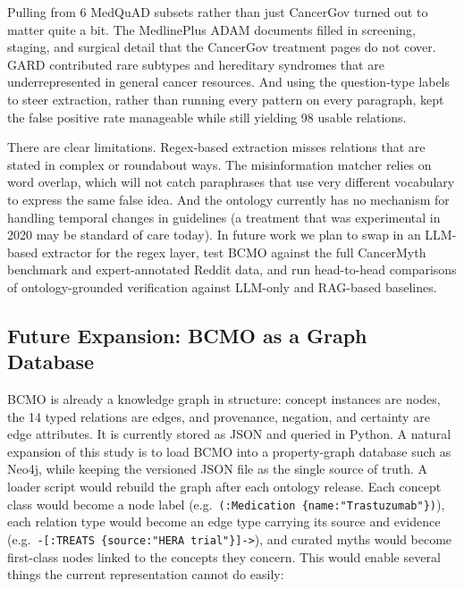 \documentclass[10pt,a4paper]{article}
\begin{document}
Pulling from 6 MedQuAD subsets rather than just CancerGov turned out to matter quite a bit. The MedlinePlus ADAM documents filled in screening, staging, and surgical detail that the CancerGov treatment pages do not cover. GARD contributed rare subtypes and hereditary syndromes that are underrepresented in general cancer resources. And using the question-type labels to steer extraction, rather than running every pattern on every paragraph, kept the false positive rate manageable while still yielding 98 usable relations.

There are clear limitations. Regex-based extraction misses relations that are stated in complex or roundabout ways. The misinformation matcher relies on word overlap, which will not catch paraphrases that use very different vocabulary to express the same false idea. And the ontology currently has no mechanism for handling temporal changes in guidelines (a treatment that was experimental in 2020 may be standard of care today). In future work we plan to swap in an LLM-based extractor for the regex layer, test BCMO against the full CancerMyth benchmark and expert-annotated Reddit data, and run head-to-head comparisons of ontology-grounded verification against LLM-only and RAG-based baselines.

\subsection{Future Expansion: BCMO as a Graph Database}
\label{sec:future-graph}

BCMO is already a knowledge graph in structure: concept instances are nodes, the 14 typed relations are edges, and provenance, negation, and certainty are edge attributes. It is currently stored as JSON and queried in Python. A natural expansion of this study is to load BCMO into a property-graph database such as Neo4j, while keeping the versioned JSON file as the single source of truth. A loader script would rebuild the graph after each ontology release. Each concept class would become a node label (e.g.\ \texttt{(:Medication \{name:"Trastuzumab"\})}), each relation type would become an edge type carrying its source and evidence (e.g.\ \texttt{-[:TREATS \{source:"HERA trial"\}]->}), and curated myths would become first-class nodes linked to the concepts they concern. This would enable several things the current representation cannot do easily:
\end{document}

